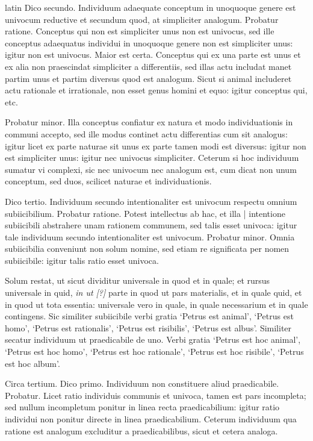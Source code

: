 \begin{otherlanguage*}{latin}
\pstart
 Dico secundo. Individuum adaequate conceptum in unoquoque genere est univocum reductive et secundum quod, at simpliciter analogum. Probatur ratione. Conceptus qui non est simpliciter unus non est univocus, sed ille conceptus adaequatus individui in unoquoque genere non est simpliciter unus: igitur non est univocus. Maior est certa. Conceptus qui ex una parte est unus et ex alia non praescindat simpliciter a differentiis, sed illas actu includat manet partim unus et partim diversus quod est analogum. Sicut si animal includeret actu rationale et irrationale, non esset genus homini et equo: igitur conceptus qui, etc. 
\pend

\pstart
 Probatur minor. Illa conceptus confiatur ex natura et modo individuationis in communi accepto, sed ille modus continet actu differentias cum sit analogus: igitur licet ex parte naturae sit unus ex parte tamen modi est diversus: igitur non est simpliciter unus: igitur nec univocus simpliciter. Ceterum si hoc individuum sumatur vi complexi, sic nec univocum nec analogum est, cum dicat non unum conceptum, sed duos, scilicet naturae et individuationis. 
\pend

\pstart
 Dico tertio. Individuum secundo intentionaliter est univocum respectu omnium subiicibilium. Probatur ratione. Potest intellectus ab hac, et illa  \textnormal{|} intentione subiicibili abstrahere unam rationem communem, sed talis esset univoca: igitur tale individuum secundo intentionaliter est univocum. Probatur minor. Omnia subiicibilia conveniunt non solum nomine, sed etiam re significata per nomen subiicibile: igitur talis ratio esset univoca. 
\pend

\pstart
 Solum restat, ut sicut dividitur universale in quod et in quale; et rursus universale in quid, \emph{in ut [?]} parte in quod ut pars materialis, et in quale quid, et in quod ut tota essentia: universale vero in quale, in quale necessarium et in quale contingens. Sic similiter subiicibile verbi gratia `Petrus est animal', `Petrus est homo', `Petrus est rationalis', `Petrus est risibilis', `Petrus est albus'. Similiter secatur individuum ut praedicabile de uno. Verbi gratia `Petrus est hoc animal', `Petrus est hoc homo', `Petrus est hoc rationale', `Petrus est hoc risibile', `Petrus est hoc album'. 
\pend

\pstart
 Circa tertium. Dico primo. Individuum non constituere aliud praedicabile. Probatur. Licet ratio individuis communis et univoca, tamen est pars incompleta; sed nullum incompletum ponitur in linea recta praedicabilium: igitur ratio individui non ponitur directe in linea praedicabilium. Ceterum individuum qua ratione est analogum excluditur a praedicabilibus, sicut et cetera analoga. 
\pend


\end{otherlanguage*}
